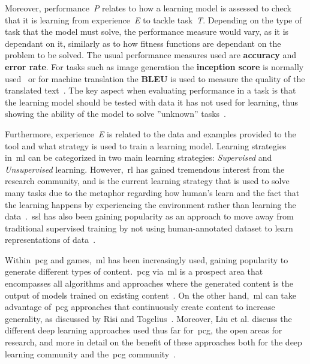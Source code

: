 Moreover, performance~\textit{P} relates to how a learning model is assessed to check that it is learning from experience~\textit{E} to tackle task~\textit{T}. Depending on the type of task that the model must solve, the performance measure would vary, as it is dependant on it, similarly as to how fitness functions are dependant on the problem to be solved. The usual performance measures used are \textbf{accuracy} and \textbf{error rate}. For tasks such as image generation the \textbf{inception score} is normally used~\cite{salimans_improved_2016} or for machine translation the \textbf{BLEU} is used to measure the quality of the translated text~\cite{papineni_bleu_2002}. The key aspect when evaluating performance in a task is that the learning model should be tested with data it has not used for learning, thus showing the ability of the model to solve ''unknown'' tasks~\cite{goodfellow_deep_2016}. 

Furthermore, experience~\textit{E} is related to the data and examples provided to the tool and what strategy is used to train a learning model. Learning strategies in~\acrshort{ml} can be categorized in two main learning strategies: \emph{Supervised} and \emph{Unsupervised} learning. However,~\acrfull{rl} has gained tremendous interest from the research community, and is the current learning strategy that is used to solve many tasks due to the metaphor regarding how human's learn and the fact that the learning happens by experiencing the environment rather than learning the data~\cite{juliani_obstacle_2019}.~\acrfull{ssl} has also been gaining popularity as an approach to move away from traditional supervised training by not using human-annotated dataset to learn representations of data~\cite{doersch_multi-task_2017}.

Within~\acrlong{pcg} and games,~\acrshort{ml} has been increasingly used, gaining popularity to generate different types of content.~\acrshort{pcg} via~\acrshort{ml} is a prospect area that encompasses all algorithms and approaches where the generated content is the output of models trained on existing content~\cite{summerville_procedural_2018}. On the other hand,~\acrshort{ml} can take advantage of~\acrshort{pcg} approaches that continuously create content to increase generality, as discussed by Risi and Togelius~\cite{risi_increasing_2020}. Moreover, Liu et al. discuss the different deep learning approaches used thus far for~\acrshort{pcg}, the open areas for research, and more in detail on the benefit of these approaches both for the deep learning community and the~\acrshort{pcg} community~\cite{liu_deep_2021}.

